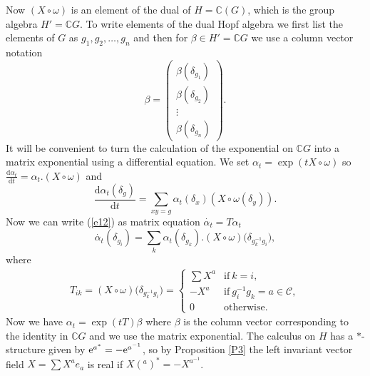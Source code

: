 \documentclass[pdftex]{sigma}
\numberwithin{equation}{section}
\newcommand{\extd}{\mathrm{d}}
\newcommand{\C}{\mathbb{C}}
\newcommand{\<}{\langle}
\renewcommand{\>}{\rangle}
\begin{document}
Now $ (X \circ \omega) $ is an element of the dual of $ H=\C(G) $, which is the group algebra $H'= \C G $. To write elements of the dual Hopf algebra we first list the elements of $ G $ as $ g_{1},g_{2}, \dots, g_{n} $ and then for $ \beta \in H' =\C G $ we use a column vector notation
\begin{equation}\label{e52}
	\beta= \left( \begin{matrix}
		\beta(\delta_{g_{1}})\\
		\beta(\delta_{g_{2}})\\
		\vdots\\
		\beta(\delta_{g_{n}})
	\end{matrix} \right).
\end{equation}
It will be convenient to turn the calculation of the exponential on $ \C G $ into a matrix exponential using a differential equation. We set $ \alpha_t =\exp (t X \circ \omega) $ so $ \frac{ \extd \alpha_t }{ \extd t}= \alpha_t. (X \circ \omega) $ and
\begin{equation}\label{e12}
\dfrac{ \extd \alpha _t(\delta_{g}) }{ \extd t}= \sum_{ xy=g} \alpha_t (\delta_x) (X \circ \omega(\delta_{y})).
\end{equation}
Now we can write (\ref{e12}) as matrix equation $ \dot{\alpha_t }=T\alpha _t $
\begin{equation}\label{e46}
\dot{\alpha_t }(\delta_{g_{i}})=\sum_{k} \alpha_t (\delta_{g_{k}}). (X \circ \omega)\big(\delta_{g_{k}^{-1} g_{i}}\big),
\end{equation}
where
\begin{gather}\label{e13}
T_{ik}= (X \circ \omega)\big(\delta_{g_{k}^{-1} g_{i}}\big)=\begin{cases}
\sum X^{a} & \mbox{if} \ k=i, \\
- X^{a} & \mbox{if}\ g_{i}^{-1} g_{k}=a \in \mathcal{C},\\
0 & \mbox{otherwise}.
\end{cases}
\end{gather}
Now we have $ \alpha_t= \exp (t T) \beta $ where $ \beta $ is the column vector corresponding to the identity in $ \C G $ and we use the matrix exponential.
The calculus on $ H $ has a $ * $-structure given by $ {\rm e}^{a^{*}}=-{\rm e}^{a^{-1}} $, so by Proposition \ref{P3} the left invariant vector field $ X=\sum X^{a} e_{a} $ is real if $ X(^{a} )^{*}=-X^{a^{-1}}$.
\end{document}
